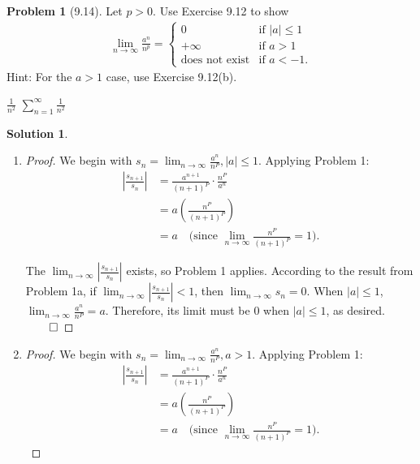 \documentclass[12pt]{article}
\theoremstyle{definition} %
\newtheorem{solution}{Solution}
\newtheorem{problem}{Problem}
\theoremstyle{plain} %
\begin{document}
\begin{problem}[9.14]
    Let $p > 0$. Use Exercise 9.12 to show
    \begin{align}\lim_{n \to \infty} \frac{a^n}{n^p} = 
    \begin{cases} 
    0 & \text{if } |a| \leq 1 \\ 
    +\infty & \text{if } a > 1 \\ 
    \text{does not exist} & \text{if } a < -1.
    \end{cases}\end{align}
    Hint: For the $a > 1$ case, use Exercise 9.12(b).

\end{problem}
$\frac{1}{n^{2}}$ 
$\sum_{n=1}^{\infty} \frac{1}{n^{2}}$ 
\begin{solution}
\begin{enumerate}
    \item\begin{proof}
        We begin with $s_n = \lim_{n \to \infty} \frac{a^n}{n^P}, |a| \leq 1$. Applying Problem 1:
        \begin{align}
            \left| \frac{s_{n+1}}{s_n} \right| &= \frac{a^{n+1}}{(n+1)^P} \cdot \frac{n^P}{a^n} \tag{17} \\
            &= a \left( \frac{n^P}{(n+1)^P} \right) \tag{18} \\
            &= a \tag{19} \quad \text{(since } \lim_{n \to \infty} \frac{n^P}{(n+1)^P} = 1\text{)}.
        \end{align}
    
        The $\lim_{n \to \infty} \left| \frac{s_{n+1}}{s_n} \right|$ exists, so Problem 1 applies. According to the result from Problem 1a, if $\lim_{n \to \infty} \left| \frac{s_{n+1}}{s_n} \right| < 1$, then $\lim_{n \to \infty} s_n = 0$. When $|a| \leq 1$, $\lim_{n \to \infty} \frac{a^n}{n^P} = a$. Therefore, its limit must be 0 when $|a| \leq 1$, as desired. $\qed$
    \end{proof} 
    \item \begin{proof}
        We begin with $s_n = \lim_{n \to \infty} \frac{a^n}{n^P}, a > 1$. Applying Problem 1:
        \begin{align}
            \left| \frac{s_{n+1}}{s_n} \right| &= \frac{a^{n+1}}{(n+1)^P} \cdot \frac{n^P}{a^n} \tag{20} \\
            &= a \left( \frac{n^P}{(n+1)^P} \right) \tag{21} \\
            &= a \tag{22} \quad \text{(since } \lim_{n \to \infty} \frac{n^P}{(n+1)^P} = 1\text{)}.
        \end{align}
    

\end{proof}
\end{enumerate}
\end{solution}
\end{document}
